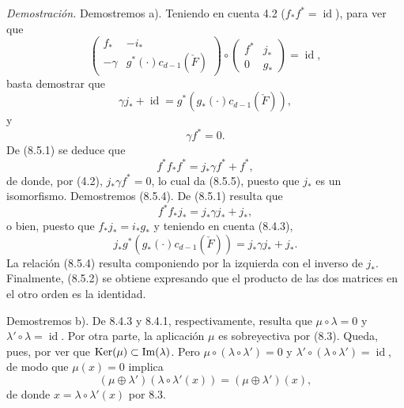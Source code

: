 \emph{Demostración.} Demostremos a). Teniendo en cuenta 4.2 ($f_*f^*=\operatorname{id}$), para ver que
\[
\begin{pmatrix}
f_*&-i_*\\
-\gamma&g^*(\cdot)c_{d-1}(\check F)
\end{pmatrix}
\circ
\begin{pmatrix}
f^*&j_*\\
0&g_*
\end{pmatrix}
=\operatorname{id},
\]
basta demostrar que
\[
\gamma j_*+\operatorname{id}=g^*(g_*(\cdot)c_{d-1}(\check F)),
\tag{8.5.4}
\]
y
\[
\gamma f^*=0.
\tag{8.5.5}
\]
De (8.5.1) se deduce que
\[
f^*f_*f^*=j_*\gamma f^*+f^*,
\]
de donde, por (4.2), $j_*\gamma f^*=0$, lo cual da (8.5.5), puesto que $j_*$ es un isomorfismo. Demostremos (8.5.4). De (8.5.1) resulta que
\[
f^*f_*j_*=j_*\gamma j_*+j_*,
\]
o bien, puesto que $f_*j_*=i_*g_*$ y teniendo en cuenta (8.4.3),
\[
j_*g^*(g_*(\cdot)c_{d-1}(\check F))=j_*\gamma j_*+j_*.
\]
La relación (8.5.4) resulta componiendo por la izquierda con el inverso de $j_*$. Finalmente, (8.5.2) se obtiene expresando que el producto de las dos matrices en el otro orden es la identidad.

Demostremos b). De 8.4.3 y 8.4.1, respectivamente, resulta que $\mu\circ\lambda=0$ y $\lambda'\circ\lambda=\operatorname{id}$. Por otra parte, la aplicación $\mu$ es sobreyectiva por (8.3). Queda, pues, por ver que $\operatorname{Ker}(\mu)\subset\operatorname{Im}(\lambda)$. Pero $\mu\circ(\lambda\circ\lambda')=0$ y $\lambda'\circ(\lambda\circ\lambda')=\operatorname{id}$, de modo que $\mu(x)=0$ implica
\[
(\mu\oplus\lambda')(\lambda\circ\lambda'(x))=(\mu\oplus\lambda')(x),
\]
de donde $x=\lambda\circ\lambda'(x)$ por 8.3.
